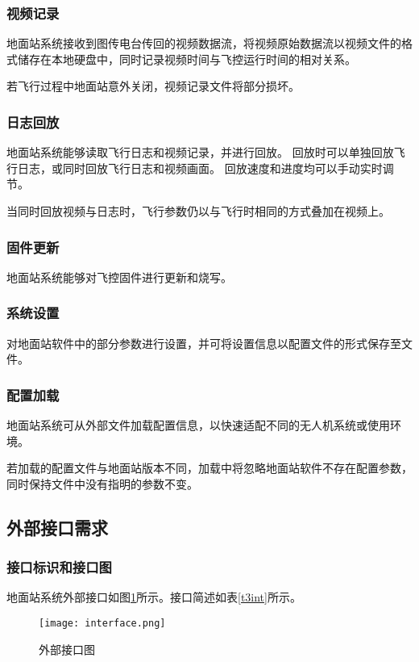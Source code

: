 \subsubsection{视频记录}
地面站系统接收到图传电台传回的视频数据流，将视频原始数据流以视频文件的格式储存在本地硬盘中，同时记录视频时间与飞控运行时间的相对关系。

若飞行过程中地面站意外关闭，视频记录文件将部分损坏。

\subsubsection{日志回放}
地面站系统能够读取飞行日志和视频记录，并进行回放。
回放时可以单独回放飞行日志，或同时回放飞行日志和视频画面。
回放速度和进度均可以手动实时调节。

当同时回放视频与日志时，飞行参数仍以与飞行时相同的方式叠加在视频上。


\subsubsection{固件更新}
地面站系统能够对飞控固件进行更新和烧写。

\subsubsection{系统设置}
对地面站软件中的部分参数进行设置，并可将设置信息以配置文件的形式保存至文件。

\subsubsection{配置加载}
地面站系统可从外部文件加载配置信息，以快速适配不同的无人机系统或使用环境。

若加载的配置文件与地面站版本不同，加载中将忽略地面站软件不存在配置参数，同时保持文件中没有指明的参数不变。

\subsection{外部接口需求}

\subsubsection{接口标识和接口图}
地面站系统外部接口如图\ref{f3int}所示。接口简述如表\ref{t3int}所示。
\begin{figure}[ht]
	\begin{center}
		\texttt{[image: interface.png]}
		\caption{外部接口图}
		\label{f3int}
	\end{center}
\end{figure}

